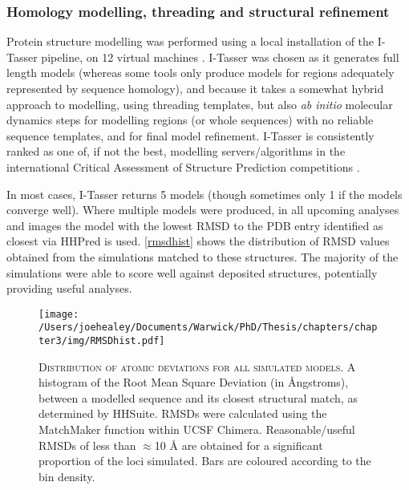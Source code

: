\subsubsection{Homology modelling, threading and structural refinement}
Protein structure modelling was performed using a local installation of the I-Tasser pipeline, on 12 virtual machines \citep{Yang2014, Roy2010, Zhang2008}. I-Tasser was chosen as it generates full length models (whereas some tools only produce models for regions adequately represented by sequence homology), and because it takes a somewhat hybrid approach to modelling, using threading templates, but also \emph{ab initio} molecular dynamics steps for modelling regions (or whole sequences) with no reliable sequence templates, and for final model refinement. I-Tasser is consistently ranked as one of, if not the best, modelling servers/algorithms in the international Critical Assessment of Structure Prediction competitions \citep{Moult2015}.

In most cases, I-Tasser returns 5 models (though sometimes only 1 if the models converge well). Where multiple models were produced, in all upcoming analyses and images the model with the lowest RMSD to the PDB entry identified as closest via HHPred is used. \vref{rmsdhist} shows the distribution of RMSD values obtained from the simulations matched to these structures. The majority of the simulations were able to score well against deposited structures, potentially providing useful analyses.

\begin{figure}[h]
\centering
{}
\texttt{[image: /Users/joehealey/Documents/Warwick/PhD/Thesis/chapters/chapter3/img/RMSDhist.pdf]}
	\captionsetup{singlelinecheck=off, justification=justified, font=footnotesize, aboveskip=10pt}
	\caption[I-Tasser model accuracy distribution - RMSD]{\textsc{\normalsize Distribution of atomic deviations for all simulated models.}\vspace{0.1cm} \newline A histogram of the Root Mean Square Deviation (in \AA{}ngstroms), between a modelled sequence and its closest structural match, as determined by HHSuite. RMSDs were calculated using the MatchMaker function within UCSF Chimera. Reasonable/useful RMSDs of less than $\approx$10 \AA{} are obtained for a significant proportion of the loci simulated. Bars are coloured according to the bin density.}
	\label{rmsdhist}
\end{figure}

